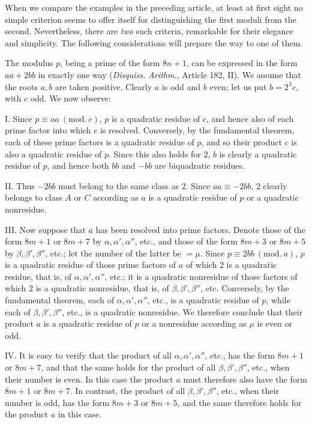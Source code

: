 %
When we compare the examples in the preceding article, at least at first sight no simple criterion seems to offer itself for distinguishing the first moduli from the second. Nevertheless, there are \emph{two} such criteria, remarkable for their elegance and simplicity. The following considerations will prepare the way to one of them.

The modulus $p$, being a prime of the form $8n+1$, can be expressed in the form $aa+2bb$ in exactly one way (\emph{Disquiss. Arithm.}, Article 182, II). We assume that the roots $a,b$ are taken positive. Clearly $a$ is odd and $b$ even; let us put $b=2^\lambda c$, with $c$ odd. We now observe:

I. Since $p\equiv aa\ (\mathrm{mod.}\ c)$, $p$ is a quadratic residue of $c$, and hence also of each prime factor into which $c$ is resolved. Conversely, by the fundamental theorem, each of these prime factors is a quadratic residue of $p$, and so their product $c$ is also a quadratic residue of $p$. Since this also holds for $2$, $b$ is clearly a quadratic residue of $p$, and hence both $bb$ and $-bb$ are biquadratic residues.

II. Thus $-2bb$ must belong to the same class as $2$. Since $aa\equiv-2bb$, $2$ clearly belongs to class $A$ or $C$ according as $a$ is a quadratic residue of $p$ or a quadratic nonresidue.

III. Now suppose that $a$ has been resolved into prime factors. Denote those of the form $8m+1$ or $8m+7$ by $\alpha,\alpha',\alpha''$, etc., and those of the form $8m+3$ or $8m+5$ by $\beta,\beta',\beta''$, etc.; let the number of the latter be $=\mu$. Since $p\equiv2bb\ (\mathrm{mod.}\ a)$, $p$ is a quadratic residue of those prime factors of $a$ of which $2$ is a quadratic residue, that is, of $\alpha,\alpha',\alpha''$, etc.; it is a quadratic nonresidue of those factors of which $2$ is a quadratic nonresidue, that is, of $\beta,\beta',\beta''$, etc. Conversely, by the fundamental theorem, each of $\alpha,\alpha',\alpha''$, etc., is a quadratic residue of $p$, while each of $\beta,\beta',\beta''$, etc., is a quadratic nonresidue. We therefore conclude that their product $a$ is a quadratic residue of $p$ or a nonresidue according as $\mu$ is even or odd.

IV. It is easy to verify that the product of all $\alpha,\alpha',\alpha''$, etc., has the form $8m+1$ or $8m+7$, and that the same holds for the product of all $\beta,\beta',\beta''$, etc., when their number is even. In this case the product $a$ must therefore also have the form $8m+1$ or $8m+7$. In contrast, the product of all $\beta,\beta',\beta''$, etc.,\space%
%
when their number is odd, has the form $8m+3$ or $8m+5$, and the same therefore holds for the product $a$ in this case.

